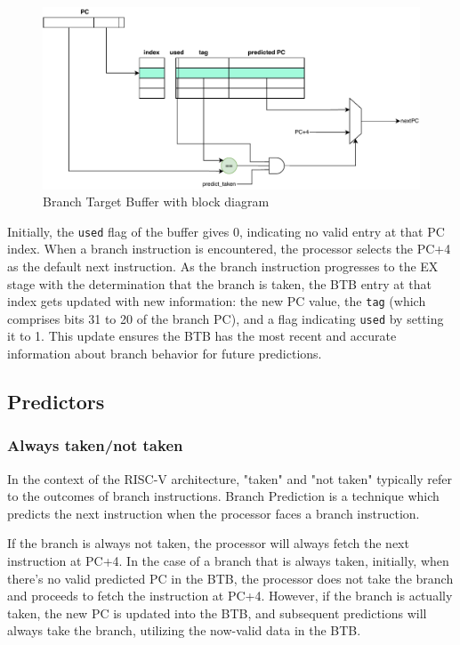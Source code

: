 \documentclass[12pt,a4paper,oneside]{book} %
\begin{document}
\begin{figure}[H]
    \centering
    \includegraphics[width=\textwidth]{images/predictor/BTB.pdf}
    \caption{Branch Target Buffer with block diagram}
\end{figure}

Initially, the \texttt{used} flag of the buffer gives 0, indicating no valid entry at that PC index. When a branch instruction is encountered, the processor selects the PC+4 as the default next instruction. As the branch instruction progresses to the EX stage with the determination that the branch is taken, the BTB entry at that index gets updated with new information: the new PC value, the \texttt{tag} (which comprises bits 31 to 20 of the branch PC), and a flag indicating \texttt{used} by setting it to 1. This update ensures the BTB has the most recent and accurate information about branch behavior for future predictions.

\subsection{Predictors}
\subsubsection{Always taken/not taken}

In the context of the RISC-V architecture, "taken" and "not taken" typically refer to the outcomes of branch instructions. Branch Prediction is a technique which predicts the next instruction when the processor faces a branch instruction.

If the branch is always not taken, the processor will always fetch the next instruction at PC+4. In the case of a branch that is always taken, initially, when there's no valid predicted PC in the BTB, the processor does not take the branch and proceeds to fetch the instruction at PC+4. However, if the branch is actually taken, the new PC is updated into the BTB, and subsequent predictions will always take the branch, utilizing the now-valid data in the BTB.
\end{document}
